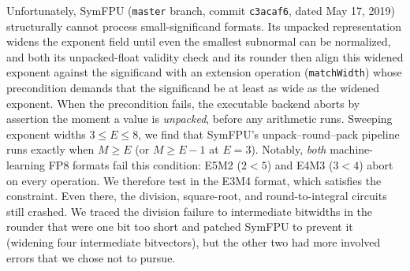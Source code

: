 Unfortunately, SymFPU (\texttt{master} branch, commit \texttt{c3acaf6}, dated May 17, 2019) structurally
cannot process small-significand formats.
Its unpacked representation widens the exponent field until even the smallest
subnormal can be normalized, and both its unpacked-float validity check and its
rounder then align this widened exponent against the significand with an
extension operation (\texttt{matchWidth}) whose precondition demands that the
significand be at least as wide as the widened exponent.
When the precondition fails, the executable backend aborts by assertion the
moment a value is \emph{unpacked}, before any arithmetic runs.
Sweeping exponent widths $3 \le E \le 8$, we find that SymFPU's
unpack--round--pack pipeline runs exactly when $M \ge E$
(or $M \ge E - 1$ at $E = 3$).
Notably, \emph{both} machine-learning FP8 formats fail this condition:
E5M2 ($2 < 5$) and E4M3 ($3 < 4$) abort on every operation.
We therefore test in the E3M4 format, which satisfies the constraint.
Even there, the division, square-root,
and round-to-integral circuits still crashed. We traced the division failure to intermediate
bitwidths in the rounder that were one bit too short and patched SymFPU to prevent it
(widening four intermediate bitvectors), but the other two had
more involved errors that we chose not to pursue.

